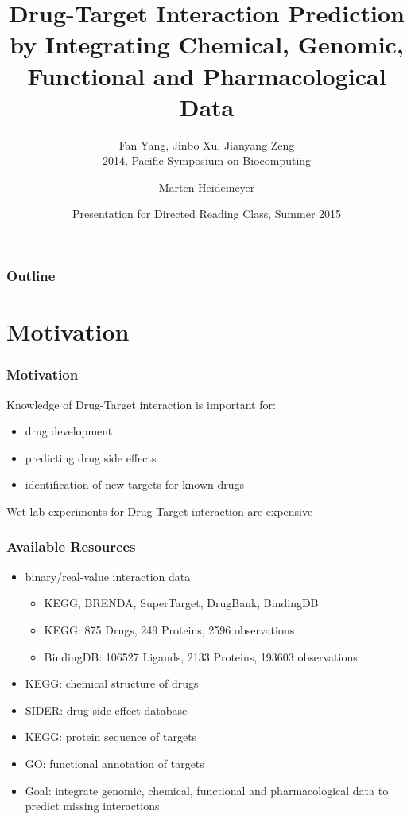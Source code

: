 \documentclass[11pt]{beamer}
\title[Drug-Target Interaction Prediction by Integrating Chemical, Genomic, Functional and Pharmacological Data] %
{Drug-Target Interaction Prediction by Integrating Chemical, Genomic, Functional and Pharmacological Data}
\subtitle{Fan Yang, Jinbo Xu, Jianyang Zeng\\2014, Pacific Symposium on Biocomputing}
\author[] %
{Marten Heidemeyer}
\date[\today] %
{Presentation for Directed Reading Class, Summer 2015}
\begin{document}
\frame{\titlepage}
\begin{frame}
\frametitle{Outline}
\tableofcontents[]
\end{frame}

\section{Motivation}
\begin{frame}
\frametitle{Motivation}
Knowledge of Drug-Target interaction is important for:
\begin{itemize}
\item drug development
\item predicting drug side effects
\item identification of new targets for known drugs
\end{itemize}
Wet lab experiments for Drug-Target interaction are expensive
\end{frame}
\begin{frame}
\frametitle{Available Resources}
\begin{itemize}
\item binary/real-value interaction data
\begin{itemize}
\item KEGG, BRENDA, SuperTarget, DrugBank, BindingDB
\item KEGG: 875 Drugs, 249 Proteins, 2596 observations
\item BindingDB: 106527 Ligands, 2133 Proteins, 193603 observations
\end{itemize}
\item KEGG: chemical structure of drugs
\item SIDER: drug side effect database
\item KEGG: protein sequence of targets
\item GO: functional annotation of targets
\pause
\item Goal: integrate genomic, chemical, functional and pharmacological data to predict missing interactions
\end{itemize}
\end{frame}
\end{document}
